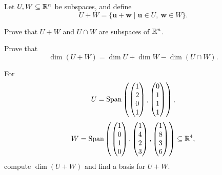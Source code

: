 \begin{problem}
Let $U,W\subseteq\mathbb{R}^n$ be subspaces, and define
\[
U+W=\{\mathbf u+\mathbf w\mid \mathbf u\in U,\ \mathbf w\in W\}.
\]
\begin{problemsubparts}
\item Prove that $U+W$ and $U\cap W$ are subspaces of $\mathbb{R}^n$.
\item Prove that
\[
\dim(U+W)=\dim U+\dim W-\dim(U\cap W).
\]
\item For
\[
U=\operatorname{Span}\left(
\begin{pmatrix}1\\2\\0\\1\end{pmatrix},
\begin{pmatrix}0\\1\\1\\1\end{pmatrix}
\right),
\]
\[
W=\operatorname{Span}\left(
\begin{pmatrix}1\\0\\1\\0\end{pmatrix},
\begin{pmatrix}1\\4\\2\\3\end{pmatrix},
\begin{pmatrix}1\\8\\3\\6\end{pmatrix}
\right)\subseteq\mathbb{R}^4,
\]
compute $\dim(U+W)$ and find a basis for $U+W$.
\end{problemsubparts}
\end{problem}

